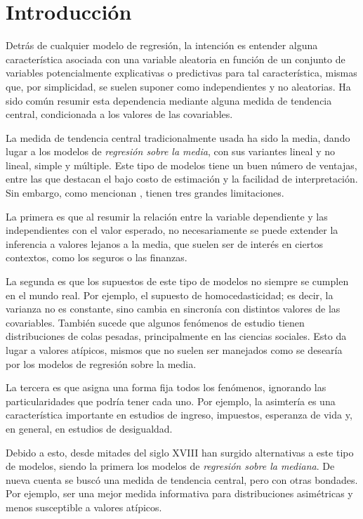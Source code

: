 \chapter{Introducci\'on}

Detr\'as de cualquier modelo de regresi\'on, la intenci\'on es entender alguna caracter\'istica asociada con una variable aleatoria en funci\'on de un conjunto de variables potencialmente explicativas o predictivas para tal caracter\'istica, mismas que, por simplicidad, se suelen suponer como independientes y no aleatorias. Ha sido com\'un resumir esta dependencia mediante alguna medida de tendencia central, condicionada a los valores de las covariables.

La medida de tendencia central tradicionalmente usada ha sido la media, dando lugar a los modelos de \textit{regresi\'on sobre la media}, con sus variantes lineal y no lineal, simple y m\'ultiple. Este tipo de modelos tiene un buen n\'umero de ventajas, entre las que destacan el bajo costo de estimaci\'on y la facilidad de interpretaci\'on. Sin embargo, como mencionan \cite{Hao_FrecQuantReg}, tienen tres grandes limitaciones.

La primera es que al resumir la relaci\'on entre la variable dependiente y las independientes con el valor esperado, no necesariamente se puede extender la inferencia a valores lejanos a la media, que suelen ser de inter\'es en ciertos contextos, como los seguros o las finanzas.

La segunda es que los supuestos de este tipo de modelos no siempre se cumplen en el mundo real. Por ejemplo, el supuesto de homocedasticidad; es decir, la varianza no es constante, sino cambia en sincron\'ia con distintos valores de las covariables. Tambi\'en sucede que algunos fen\'omenos de estudio tienen distribuciones de colas pesadas, principalmente en las ciencias sociales. Esto da lugar a valores at\'ipicos, mismos que no suelen ser manejados como se desear\'ia por los modelos de regresi\'on sobre la media.

La tercera es que asigna una forma fija todos los fen\'omenos, ignorando las particularidades que podr\'ia tener cada uno. Por ejemplo, la asimter\'ia es una caracter\'istica importante en estudios de ingreso, impuestos, esperanza de vida y, en general, en estudios de desigualdad.

Debido a esto, desde mitades del siglo XVIII han surgido alternativas a este tipo de modelos, siendo la primera los modelos de \textit{regresi\'on sobre la mediana}. De nueva cuenta se busc\'o una medida de tendencia central, pero con otras bondades. Por ejemplo, ser una mejor medida informativa para distribuciones asim\'etricas y menos susceptible a valores at\'ipicos. 

